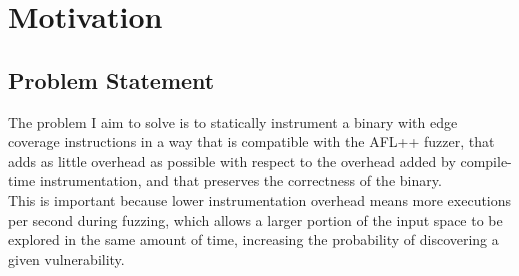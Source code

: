 \documentclass{report}
\begin{document}
        \chapter{Motivation}
            \section{Problem Statement}
                The problem I aim to solve is to statically instrument a binary with edge coverage instructions
                in a way that is compatible with the AFL++ fuzzer, that adds as little overhead as possible with respect to
                the overhead added by compile-time instrumentation, and that preserves the correctness of the binary.\\
                This is important because lower instrumentation overhead means more executions per second during fuzzing,
                 which allows a larger portion of the input space to be explored in the same amount of time,
                 increasing the probability of discovering a given vulnerability.
\end{document}
